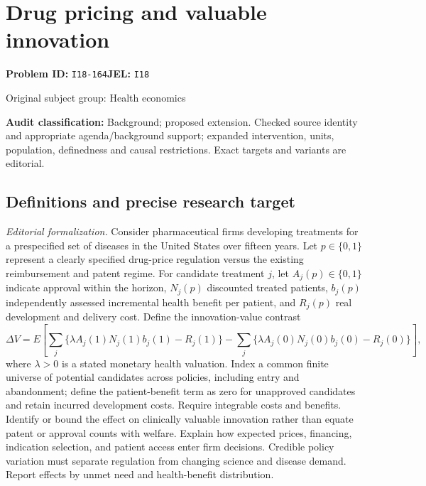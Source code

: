 \documentclass[11pt,a4paper]{article}
\begin{document}
\section*{Drug pricing and valuable innovation}
\textbf{Problem ID:} \texttt{I18-164}\quad \textbf{JEL:} \texttt{I18}\par
\label{problem:OP-0445}
{\sffamily\small\color{muted}Original subject group: Health economics\par}
\label{definitions:problem:30007727}
\textbf{Audit classification:} Background; proposed extension. Checked source identity and appropriate agenda/background support; expanded intervention, units, population, definedness and causal restrictions. Exact targets and variants are editorial.
\subsection*{Definitions and precise research target}
\textit{Editorial formalization.} Consider pharmaceutical firms developing treatments for a prespecified set of diseases in the United States over fifteen years. Let \(p\in\{0,1\}\) represent a clearly specified drug-price regulation versus the existing reimbursement and patent regime. For candidate treatment \(j\), let \(A_j(p)\in\{0,1\}\) indicate approval within the horizon, \(N_j(p)\) discounted treated patients, \(b_j(p)\) independently assessed incremental health benefit per patient, and \(R_j(p)\) real development and delivery cost. Define the innovation-value contrast
\[\Delta V=E\!\left[\sum_j\{\lambda A_j(1)N_j(1)b_j(1)-R_j(1)\}-\sum_j\{\lambda A_j(0)N_j(0)b_j(0)-R_j(0)\}\right],\]
where \(\lambda>0\) is a stated monetary health valuation. Index a common finite universe of potential candidates across policies, including entry and abandonment; define the patient-benefit term as zero for unapproved candidates and retain incurred development costs. Require integrable costs and benefits. Identify or bound the effect on clinically valuable innovation rather than equate patent or approval counts with welfare. Explain how expected prices, financing, indication selection, and patient access enter firm decisions. Credible policy variation must separate regulation from changing science and disease demand. Report effects by unmet need and health-benefit distribution.
\end{document}
